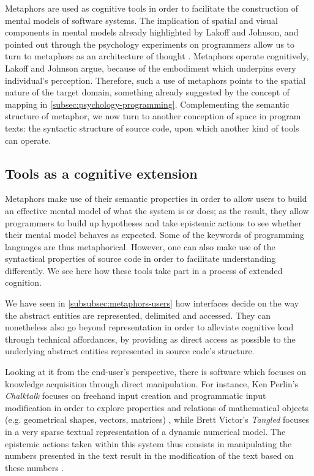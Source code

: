 Metaphors are used as cognitive tools in order to facilitate the construction of mental models of software systems. The implication of spatial and visual components in mental models already highlighted by Lakoff and Johnson, and pointed out through the psychology experiments on programmers allow us to turn to metaphors as an architecture of thought \citep{forsythe_cathedrals_1986}. Metaphors operate cognitively, Lakoff and Johnson argue, because of the embodiment which underpins every individual's perception. Therefore, such a use of metaphors points to the spatial nature of the target domain, something already suggested by the concept of mapping in \ref{subsec:psychology-programming}. Complementing the semantic structure of metaphor, we now turn to another conception of space in program texts: the syntactic structure of source code, upon which another kind of tools can operate.

\subsection{Tools as a cognitive extension}
\label{subsec:tools-cognition}

Metaphors make use of their semantic properties in order to allow users to build an effective mental model of what the system is or does; as the result, they allow programmers to build up hypotheses and take epistemic actions to see whether their mental model behaves as expected. Some of the keywords of programming languages are thus metaphorical. However, one can also make use of the syntactical properties of source code in order to facilitate understanding differently. We see here how these tools take part in a process of extended cognition.

We have seen in \ref{subsubsec:metaphors-users} how interfaces decide on the way the abstract entities are represented, delimited and accessed. They can nonetheless also go beyond representation in order to alleviate cognitive load through technical affordances, by providing as direct access as possible to the underlying abstract entities represented in source code's structure.

Looking at it from the end-user's perspective, there is software which focuses on knowledge acquisition through direct manipulation. For instance, Ken Perlin's \emph{Chalktalk} focuses on freehand input creation and programmatic input modification in order to explore properties and relations of mathematical objects (e.g. geometrical shapes, vectors, matrices) \citep{perlin_chalktalk_2022}, while Brett Victor's \emph{Tangled} focuses in a very sparse textual representation of a dynamic numerical model. The epistemic actions taken within this system thus consists in manipulating the numbers presented in the text result in the modification of the text based on these numbers \citep{victor_tangle_2011,victor_explorable_2011}.

